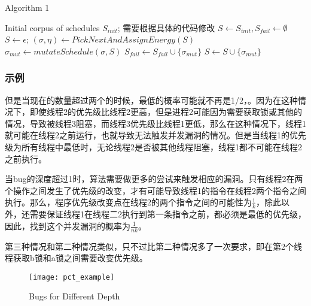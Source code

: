 \begin{algorithm}[!ht]
\caption{Algorithm 1}
\label{power}
\begin{algorithmic}[1]
    \REQUIRE  Initial corpus of schedules $S_{init}$; %
    需要根据具体的代码修改
    \STATE $S \leftarrow S_{init}, S_{fail} \leftarrow \emptyset$
     \STATE $S \leftarrow {\epsilon}$;
    \ENDIF
    \REPEAT
        \STATE $(\sigma, \eta) \leftarrow PickNextAndAssignEnergy(S)$
            \STATE $\sigma_{mut} \leftarrow mutateSchedule(\sigma, S)$
             \STATE $S_{fail} \leftarrow S_{fail} \cup \{\sigma_{mut}\}$
            \ENDIF
             \STATE $S \leftarrow S \cup \{\sigma_{mut}\}$
            \ENDIF
        \ENDFOR
\end{algorithmic}  
\end{algorithm}

\subsubsection{示例}

但是当现在的数量超过两个的时候，最低的概率可能就不再是1/2，。因为在这种情况下，即使线程2的优先级比线程2更高，但是进程2可能因为需要获取锁或其他的情况，导致被线程3阻塞，而线程3优先级比线程1更低，那么在这种情况下，线程1就可能在线程2之前运行，也就导致无法触发并发漏洞的情况。但是当线程1的优先级为所有线程中最低时，无论线程2是否被其他线程阻塞，线程1都不可能在线程2之前执行。

当bug的深度超过1时，算法需要做更多的尝试来触发相应的漏洞。只有线程2在两个操作之间发生了优先级的改变，才有可能导致线程1的指令在线程2两个指令之间执行。那么，程序优先级改变点在线程2的两个指令之间的可能性为$\frac{1}{k}$，除此以外，还需要保证线程1在线程二2执行到第一条指令之前，都必须是最低的优先级，因此，找到这个并发漏洞的概率为$\frac{1}{nk}$。

第三种情况和第二种情况类似，只不过比第二种情况多了一次要求，即在第2个线程获取b锁和a锁之间需要改变优先级。

\begin{figure}[ht]
    \centering
    \texttt{[image: pct\_example]}
    \caption{\label{fig:pct_example}Bugs for Different Depth}
\end{figure}

